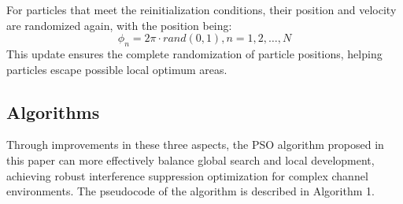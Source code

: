 \documentclass[lettersize,journal]{IEEEtran}
\begin{document}
For particles that meet the reinitialization conditions, their position and velocity are randomized again, with the position being:
\begin{equation}
  \phi_{n} = 2\pi \cdot rand(0,1),n = 1,2,\ldots,N
  \label{eq:reinitialize_position}
\end{equation}
This update ensures the complete randomization of particle positions, helping particles escape possible local optimum areas.

\subsection{Algorithms}\label{d.-algorithms}

Through improvements in these three aspects, the PSO algorithm proposed in this paper can more effectively balance global search and local development, achieving robust interference suppression optimization for complex channel environments. The pseudocode of the algorithm is described in Algorithm 1.
\end{document}
